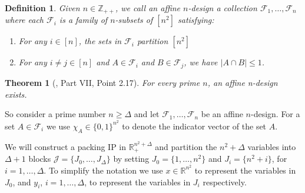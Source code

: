 \documentclass[smallextended]{svjour3}
\newtheorem{definition}[proposition]{Definition}
\newtheorem{theorem}[proposition]{Theorem}
\begin{document}
\begin{definition} Given $n \in \mathbb{Z}_{++}$, we call an \emph{affine $n$-design} a
collection $\mathcal{F}_1, \dots,  \mathcal{F}_n$ where each
$\mathcal{F}_i$ is a family of $n$-subsets of $[n^2]$ satisfying:
\begin{enumerate}
\item For any $i \in [n]$, the sets in ${\mathcal{F}}_i$ partition $[n^2]$
\item For any $i \neq j \in [n]$ and $A \in \mathcal{F}_i$ and $B \in
\mathcal{F}_j$, we have $|A \cap B| \leq 1$.
\end{enumerate}
\end{definition}

\begin{theorem}[\cite{colbourndi:2006}, Part VII, Point 2.17] For every prime $n$, an affine n-design exists.
\end{theorem}

	So consider a prime number $n \ge \Delta$ and let ${\mathcal{F}}_1, \ldots, {\mathcal{F}}_n$ be an affine $n$-design. For a set $A \in {\mathcal{F}}_i$ we use $\chi_A \in \{0,1\}^{n^2}$ to denote the indicator vector of the set $A$.
	
	We will construct a packing IP in $\mathbb{R}_+^{n^2+\Delta}$ and partition the $n^2 + \Delta$  variables into $\Delta +1$ blocks $\mathcal{J} = \{J_0,\ldots, J_{\Delta}\}$ by setting $J_0 = \{1,\ldots, n^2\}$ and $J_i = \{n^2+i\}$, for $i = 1,\ldots, \Delta$. To simplify the notation we use $x \in \mathbb{R}^{n^2}$ to represent the variables
in $J_0$, and $y_i$, $i = 1, \ldots, \Delta$, to represent the variables in $J_i$ respectively. 
\end{document}
